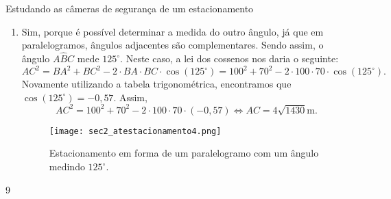 \begin{answer}{Estudando as câmeras de segurança de um estacionamento}
{\begin{enumerate}
    \item{}
    Sim, porque é possível determinar a medida do outro ângulo, já que em paralelogramos, ângulos adjacentes são complementares. Sendo assim, o ângulo $A\hat{B}C$ mede $125^\circ$. Neste caso, a lei dos cossenos nos daria o seguinte:
    $$AC^2=BA^2+BC^2-2\cdot BA\cdot BC\cdot \cos(125^\circ)=100^2+70^2-2\cdot100\cdot70\cdot \cos(125^\circ).$$
    Novamente utilizando a tabela trigonométrica, encontramos que $\cos(125^\circ)=-0,57$. Assim,
    $$AC^2=100^2+70^2-2\cdot100\cdot70\cdot (-0,57) \iff AC=4\sqrt{1430}\text{m}.$$
    \begin{figure}[H]
        \centering
        \texttt{[image: sec2\_atestacionamento4.png]}
        \caption{Estacionamento em forma de um paralelogramo com um ângulo medindo $125^\circ$.}
        \label{sec2_resatestacionamento4}
    \end{figure}
\end{enumerate}
}{9}
\end{answer}

